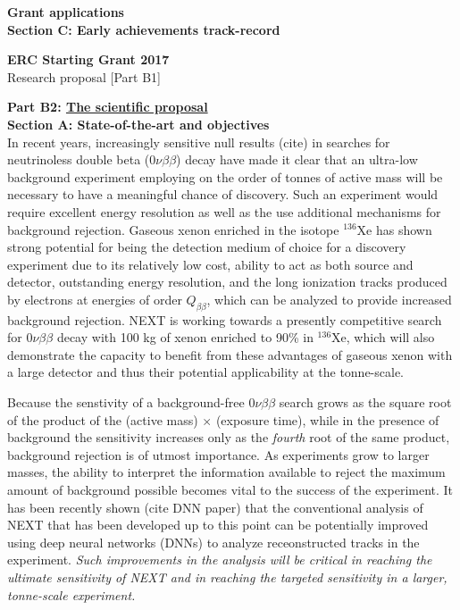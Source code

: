 \documentclass[11pt,a4paper]{article}
\begin{document}
\noindent\textbf{Grant applications}\\

\newpage
{\textbf{Section C: Early achievements track-record}}

\newpage
{}
\begin{center}
	\large
	\textbf{ERC Starting Grant 2017}\\
	Research proposal [Part B1]\\[2.0\baselineskip]
\end{center}

\noindent\textbf{Part B2: \underline{The scientific proposal}}\\

{\noindent\textbf{Section A: State-of-the-art and objectives}}\\
In recent years, increasingly sensitive null results (cite) in searches for neutrinoless double beta ($0\nu\beta\beta$) decay have made it clear that an ultra-low background experiment 
employing on the order of tonnes of active mass will be necessary to have a meaningful chance of discovery.  Such an experiment would require excellent energy resolution as well as the use
additional mechanisms for background rejection.  Gaseous xenon enriched in the isotope $^{136}$Xe has shown strong potential for being the 
detection medium of choice for a discovery experiment due to its relatively low cost, ability to act as both source and detector, outstanding energy resolution, and the long ionization 
tracks produced by electrons at energies of order $Q_{\beta\beta}$, which can be analyzed to provide increased background rejection.  NEXT is working towards a presently competitive search 
for $0\nu\beta\beta$ decay with 100 kg of xenon enriched to 90\% in $^{136}$Xe, which will also demonstrate the capacity to benefit from these advantages of gaseous xenon with a 
large detector and thus their potential applicability at the tonne-scale.

Because the senstivity of a background-free $0\nu\beta\beta$ search grows as the square root of the product of the (active mass) $\times$ (exposure time), while in the presence of background the sensitivity increases only as the \emph{fourth} root of the same product, background rejection is of utmost importance. As experiments grow to larger masses, the ability to interpret the information available to reject the maximum amount of background possible becomes vital to the success of the experiment.  It has been recently shown (cite DNN paper) that the conventional analysis of NEXT that has been developed up to this point can be potentially improved using deep neural networks (DNNs) to analyze receonstructed tracks in the experiment. \emph{Such improvements in the analysis will be critical in reaching the ultimate sensitivity of NEXT and in reaching the targeted sensitivity in a larger, tonne-scale experiment.}\\
\end{document}
